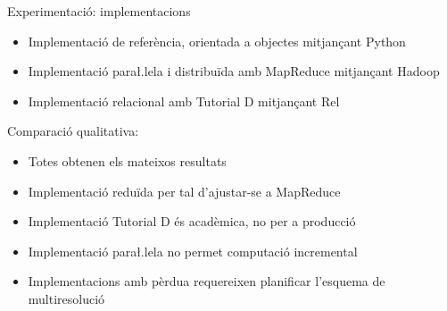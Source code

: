 \begin{frame}{Experimentació: implementacions}

  \begin{itemize}
  \item Implementació de referència, orientada a objectes mitjançant Python
  \item Implementació para\l.lela i distribuïda amb MapReduce mitjançant Hadoop
  \item Implementació relacional amb Tutorial D mitjançant Rel
  \end{itemize}



Comparació qualitativa:

  \begin{itemize}
  \item Totes obtenen els mateixos resultats
  \item Implementació reduïda per tal d'ajustar-se a MapReduce
  \item Implementació Tutorial D és acadèmica, no per a producció
  \item Implementació para\l.lela no permet computació incremental
  \item Implementacions amb pèrdua requereixen planificar l'esquema de multiresolució
  \end{itemize}


\end{frame}


